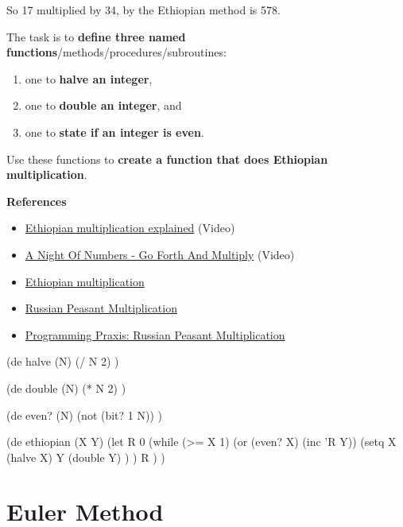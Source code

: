 So 17 multiplied by 34, by the Ethiopian method is 578.

The task is to \textbf{define three named
functions}/methods/procedures/subroutines:

\begin{enumerate}
\item
  one to \textbf{halve an integer},
\item
  one to \textbf{double an integer}, and
\item
  one to \textbf{state if an integer is even}.
\end{enumerate}

Use these functions to \textbf{create a function that does Ethiopian
multiplication}.

\textbf{References}

\begin{itemize}
\item
  \href{http://www.bbc.co.uk/learningzone/clips/ethiopian-multiplication-explained/11232.html}{Ethiopian
  multiplication explained} (Video)
\item
  \href{http://www.youtube.com/watch?v=Nc4yrFXw20Q}{A Night Of Numbers -
  Go Forth And Multiply} (Video)
\item
  \href{http://www.ncetm.org.uk/blogs/3064}{Ethiopian multiplication}
\item
  \href{http://www.bbc.co.uk/dna/h2g2/A22808126}{Russian Peasant
  Multiplication}
\item
  \href{http://thedailywtf.com/Articles/Programming-Praxis-Russian-Peasant-Multiplication.aspx}{Programming
  Praxis: Russian Peasant Multiplication}
\end{itemize}


\begin{wideverbatim}

(de halve (N)
   (/ N 2) )

(de double (N)
   (* N 2) )

(de even? (N)
   (not (bit? 1 N)) )

(de ethiopian (X Y)
   (let R 0
      (while (>= X 1)
         (or (even? X) (inc 'R Y))
         (setq
            X (halve X)
            Y (double Y) ) )
      R ) )

\end{wideverbatim}

\pagebreak{}
\section*{Euler Method}

